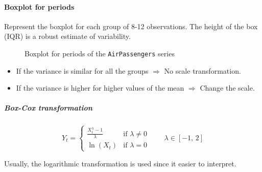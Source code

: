 \paragraph{Boxplot for periods} Represent the boxplot for each group of 8-12
observations. The height of the box (IQR) is a robust estimate of variability.

\begin{figure}[H]
	\caption{Boxplot for periods of the \texttt{AirPassengers} series}
\end{figure}

\begin{itemize}
    \item If the variance is similar for all the groups $\Longrightarrow$ No scale transformation.
    \item If the variance is higher for higher values of the mean $\Longrightarrow$ Change the scale.
\end{itemize}

\subparagraph{Box-Cox transformation}
\begin{equation}
    Y_t = \begin{cases}
        \frac{X_t^\lambda - 1}{\lambda} & \text{if } \lambda \neq 0 \\
        \ln(X_t) & \text{if } \lambda = 0
    \end{cases} \qquad \lambda \in [-1,\,2]
\end{equation}
\begin{marker}
    Usually, the logarithmic transformation is used since it easier to interpret.
\end{marker}

